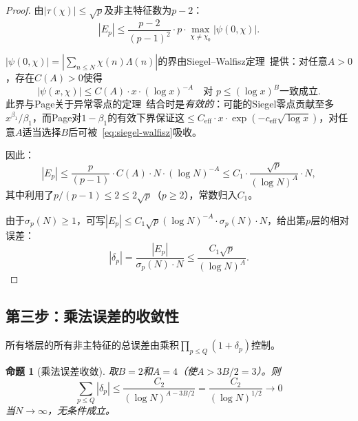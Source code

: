 \documentclass[11pt,a4paper]{article}
\newtheorem{proposition}[theorem]{命题}
\theoremstyle{remark}
\begin{document}
\begin{proof}
由$|\tau(\chi)| \leq \sqrt{p}$及非主特征数为$p-2$：
\begin{equation}
  |E_p| \leq \frac{p-2}{(p-1)^2} \cdot p \cdot \max_{\chi \neq \chi_0}
    |\psi(0,\chi)|.
\end{equation}

$|\psi(0,\chi)| = |\sum_{n \leq N}\chi(n)\Lambda(n)|$的界由Siegel--Walfisz定理~\cite[第24章]{Davenport2000}提供：对任意$A > 0$，存在$C(A) > 0$使得
\begin{equation}
\label{eq:siegel-walfisz}
  |\psi(x,\chi)| \leq C(A) \cdot x \cdot (\log x)^{-A}
  \quad \text{对 } p \leq (\log x)^B \text{一致成立}.
\end{equation}
此界与Page关于异常零点的定理~\cite[第14章]{Davenport2000}结合时是\emph{有效的}：可能的Siegel零点贡献至多$x^{\beta_1}/\beta_1$，而Page对$1-\beta_1$的有效下界保证这$\leq C_{\text{eff}} \cdot x \cdot \exp(-c_{\text{eff}}\sqrt{\log x})$，对任意$A$适当选择$B$后可被~\eqref{eq:siegel-walfisz}吸收。

因此：
\begin{equation}
  |E_p| \leq \frac{p}{(p-1)} \cdot C(A) \cdot N \cdot (\log N)^{-A}
    \leq C_1 \cdot \frac{\sqrt{p}}{(\log N)^A} \cdot N,
\end{equation}
其中利用了$p/(p-1) \leq 2 \leq 2\sqrt{p}$（$p \geq 2$），常数归入$C_1$。

由于$\sigma_p(N) \geq 1$，可写$|E_p| \leq C_1\sqrt{p}(\log N)^{-A} \cdot \sigma_p(N) \cdot N$，给出第$p$层的相对误差：
\begin{equation}
\label{eq:delta-p-bound}
  |\delta_p| = \frac{|E_p|}{\sigma_p(N) \cdot N} \leq \frac{C_1\sqrt{p}}{(\log N)^A}.
\end{equation}
\end{proof}

\subsection{第三步：乘法误差的收敛性}
\label{subsec:multiplicative-convergence}

所有塔层的所有非主特征的总误差由乘积$\prod_{p \leq Q}(1 + \delta_p)$控制。

\begin{proposition}[乘法误差收敛]
\label{prop:mult-conv}
取$B = 2$和$A = 4$（使$A > 3B/2 = 3$）。则
\begin{equation}
\label{eq:mult-conv}
  \sum_{p \leq Q}|\delta_p| \leq \frac{C_2}{(\log N)^{A - 3B/2}}
    = \frac{C_2}{(\log N)^{1/2}} \to 0
\end{equation}
当$N \to \infty$，无条件成立。
\end{proposition}
\end{document}
